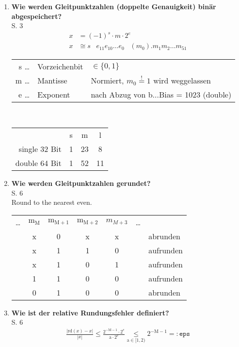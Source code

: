 \begin{enumerate}
			
		\item \textbf{Wie werden Gleitpunktzahlen (doppelte Genauigkeit) binär abgespeichert?}\\
		S. 3
			\begin{align*}
				x &= (-1)^s \cdot m \cdot 2^e \\
				x &\cong s \;\;\; e_{11}e_{10}\dots e_0 \;\;\; (m_0).m_1m_2\dots m_{51}
			\end{align*}\vspace{-0.5cm}
			\begin{table}[htbp]
				\centering
				\begin{tabular}[htpb]{rll}
					s \; \dots \!\!\! & Vorzeichenbit &$\in \{0,1\}$\\
					m \; \dots \!\!\! & Mantisse & Normiert, $m_0\overset{!}{=}1$ wird weggelassen\\
					e \; \dots \!\!\! & Exponent & nach Abzug von b$\dots$Bias = 1023 (double)
				\end{tabular} \\ \vspace{0.3cm}
				\begin{tabular}[htpb]{rccc}
					 & s & m & l \\
					  single 32 Bit & 1 & 23 & 8 \\
					  double 64 Bit & 1 & 52 & 11
				\end{tabular}
			\end{table}
		\item \textbf{Wie werden Gleitpunktzahlen gerundet?} \\
		S. 6 \\
		Round to the nearest even.
		\begin{table}[htbp]
			\centering
			\begin{tabular}[htpb]{ccccccl}
				\dots & $\text{m}_\text{M}$ & $\text{m}_{\text{M}+1}$ & $\text{m}_{\text{M}+2}$ & $m_{M+3}$ & \dots &  \\
				      & x                   & 0                       & x                       & x         &       & abrunden  \\
				      & x                   & 1                       & 1                       & 0         &       & aufrunden \\
				      & x                   & 1                       & 0                       & 1         &       & aufrunden \\
				      & 1                   & 1                       & 0                       & 0         &       & aufrunden \\
				      & 0                   & 1                       & 0                       & 0         &       & abrunden
			\end{tabular}
		\end{table}
		\item \textbf{Wie ist der relative Rundungsfehler definiert?} \\
		S. 6
		\begin{align*}
			\frac{|\text{rd}(x)-x|}{|x|}\leq \frac{2^{-\text{M}-1}\cdot2^e}{\text{a}\cdot 2^e}\underset{\text{a}\in[1,2)}{\leq}2^{-\text{M}-1}=:\texttt{eps}
		\end{align*}
		

\end{enumerate}
